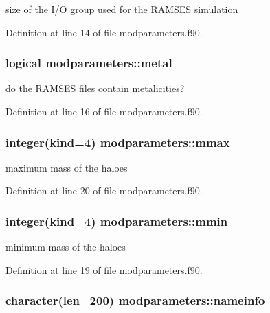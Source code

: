 size of the I/\-O group used for the R\-A\-M\-S\-E\-S simulation 



Definition at line 14 of file modparameters.\-f90.

\hypertarget{classmodparameters_a354e77e79b0b7309df87f45c994adea8}{
\subsubsection[{metal}]{\setlength{\rightskip}{0pt plus 5cm}logical modparameters\-::metal}}\label{classmodparameters_a354e77e79b0b7309df87f45c994adea8}


do the R\-A\-M\-S\-E\-S files contain metalicities? 



Definition at line 16 of file modparameters.\-f90.

\hypertarget{classmodparameters_a1dc1488fae7094ded9408953a21ada2f}{
\subsubsection[{mmax}]{\setlength{\rightskip}{0pt plus 5cm}integer(kind=4) modparameters\-::mmax}}\label{classmodparameters_a1dc1488fae7094ded9408953a21ada2f}


maximum mass of the haloes 



Definition at line 20 of file modparameters.\-f90.

\hypertarget{classmodparameters_a4f5bb13705cae2bfb6255cf7b498aacc}{
\subsubsection[{mmin}]{\setlength{\rightskip}{0pt plus 5cm}integer(kind=4) modparameters\-::mmin}}\label{classmodparameters_a4f5bb13705cae2bfb6255cf7b498aacc}


minimum mass of the haloes 



Definition at line 19 of file modparameters.\-f90.

\hypertarget{classmodparameters_a755742d02a709ed5c570a3f380604fbb}{
\subsubsection[{nameinfo}]{\setlength{\rightskip}{0pt plus 5cm}character(len=200) modparameters\-::nameinfo}}\label{classmodparameters_a755742d02a709ed5c570a3f380604fbb}


